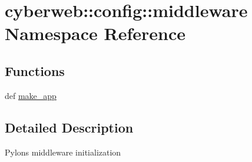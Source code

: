 \hypertarget{namespacecyberweb_1_1config_1_1middleware}{\section{cyberweb\-:\-:config\-:\-:middleware \-Namespace \-Reference}
\label{namespacecyberweb_1_1config_1_1middleware}
}
\subsection*{\-Functions}
\begin{DoxyCompactItemize}
\item 
def \hyperlink{namespacecyberweb_1_1config_1_1middleware_a2cbc5bd0bfddfadc60d09a097805a5bc}{make\-\_\-app}
\end{DoxyCompactItemize}


\subsection{\-Detailed \-Description}
\begin{DoxyVerb}
Pylons middleware initialization
\end{DoxyVerb}
 

